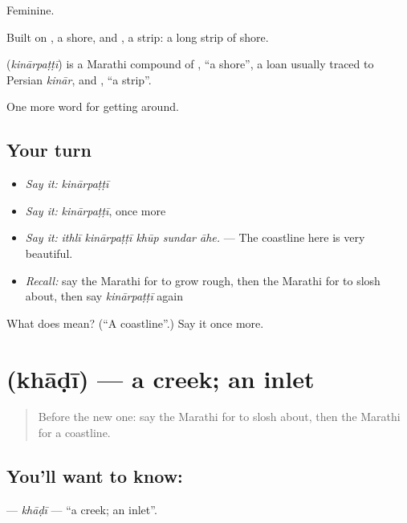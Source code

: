 Feminine.

Built on , a shore, and , a strip: a long strip of shore.

\begin{cousinweb}
\textbf{} (\emph{kinārpaṭṭī}) is a Marathi compound of \textbf{}, \textquotedblleft{}a shore\textquotedblright{}, a loan usually traced to Persian \emph{kinār}, and \textbf{}, \textquotedblleft{}a strip\textquotedblright{}.
\end{cousinweb}

\begin{grammarlens}[title={What you've built}]
One more word for getting around.
\end{grammarlens}

\subsection*{Your turn}
\begin{itemize}
\raggedright
  \item \emph{Say it:} \emph{kinārpaṭṭī}
  \item \emph{Say it:} \emph{kinārpaṭṭī}, once more
  \item \emph{Say it:} \emph{ithlī kinārpaṭṭī khūp sundar āhe.} — The coastline here is very beautiful.
  \item \emph{Recall:} say the Marathi for to grow rough, then the Marathi for to slosh about, then say \emph{kinārpaṭṭī} again
\end{itemize}

\begin{tcolorbox}[breakable,colback=teal!4,colframe=teal!35!black,title={Before you move on}]
What does  mean? (\textquotedblleft{}A coastline\textquotedblright{}.) Say it once more.
\end{tcolorbox}
\section[\texorpdfstring{\mr{खाडी} (khāḍī)}{खाडी (khāḍī)}]{ (khāḍī) — a creek; an inlet}

\label{lesson:MR-C410-khadi}



\begin{quote}
Before the new one: say the Marathi for to slosh about, then the Marathi for a coastline.
\end{quote}

\subsection*{You'll want to know: }
\textbf{} — \emph{khāḍī} — \textquotedblleft{}a creek; an inlet\textquotedblright{}.

